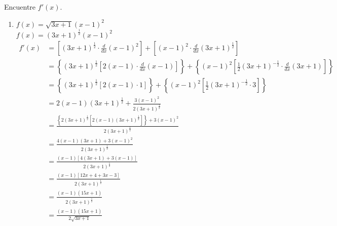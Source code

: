 \documentclass[12pt]{article}
\begin{document}
Encuentre $f'(x)$.
\begin{enumerate}[label=(\alph*)]
\item $f(x)=\sqrt{3x+1} (x-1)^2$ \\
  $f(x) =(3x+1)^{\frac{1}{2}}(x-1)^2$
  \begin{equation*}
    \begin{split}
      f'(x)
      &= \left[ (3x+1)^{\frac{1}{2}} \cdot \frac{d}{dx}(x-1)^2 \right]
         + \left[ (x-1)^2 \cdot \frac{d}{dx}(3x+1)^{\frac{1}{2}} \right]\\
      &= \left\lbrace (3x+1)^{\frac{1}{2}} \left[ 2(x-1)\cdot \frac{d}{dx}(x-1)\right] \right\rbrace
         + \left\lbrace (x-1)^2\left[\frac{1}{2}(3x+1)^{-\frac{1}{2}}\cdot \frac{d}{dx}(3x+1)\right] \right\rbrace\\
      &= \left\lbrace (3x+1)^{\frac{1}{2}} \left[ 2(x-1)\cdot 1\right] \right\rbrace
         + \left\lbrace (x-1)^2\left[\frac{1}{2}(3x+1)^{-\frac{1}{2}}\cdot 3\right] \right\rbrace\\
         &= 2(x-1)(3x+1)^{\frac{1}{2}} + \frac{3(x-1)^2}{2(3x+1)^{\frac{1}{2}}}\\
         &= \frac{\left\lbrace2(3x+1)^{\frac{1}{2}}\left[2(x-1)(3x+1)^{\frac{1}{2}}\right]\right\rbrace
           + 3(x-1)^2}{2(3x+1)^{\frac{1}{2}}}\\
         &= \frac{4(x-1)(3x+1) + 3(x-1)^2}{2(3x+1)^{\frac{1}{2}}}\\
         &= \frac{(x-1)\left[ 4(3x+1)+3(x-1)  \right]}{2(3x+1)^{\frac{1}{2}}}\\
         &= \frac{(x-1)\left[ 12x+4+3x-3  \right]}{2(3x+1)^{\frac{1}{2}}}\\
         &= \frac{(x-1)(15x+1)}{2(3x+1)^{\frac{1}{2}}}\\
         &= \frac{(x-1)(15x+1)}{2\sqrt{3x+1}}\\
    \end{split}
  \end{equation*}
  

\end{enumerate}
\end{document}
